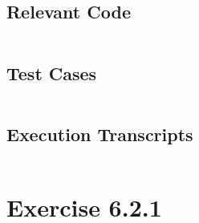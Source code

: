 \documentclass[twoside]{report}
\begin{document}
\section{Relevant Code}
\begin{scriptsize}
    \begin{verbatim}
    \end{verbatim}
\end{scriptsize}
\section{Test Cases}
\begin{scriptsize}
    \begin{verbatim}
    \end{verbatim}
\end{scriptsize}
\section{Execution Transcripts}
\begin{scriptsize}
    \begin{verbatim}
    \end{verbatim}
\end{scriptsize}

\chapter{Exercise 6.2.1}
\label{cha:6-2-1}
\end{document}

